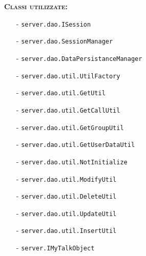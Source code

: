 \begin{description}
	\item{\scshape\bfseries Classi utilizzate:}
	\begin{itemize}[nolistsep, noitemsep]
	  \item[-] \texttt{server.dao.ISession}
	  \item[-] \texttt{server.dao.SessionManager}
	  \item[-] \texttt{server.dao.DataPersistanceManager}
	  \item[-] \texttt{server.dao.util.UtilFactory}
	  \item[-] \texttt{server.dao.util.GetUtil}
	  \item[-] \texttt{server.dao.util.GetCallUtil}
	  \item[-] \texttt{server.dao.util.GetGroupUtil}
	  \item[-] \texttt{server.dao.util.GetUserDataUtil}
	  \item[-] \texttt{server.dao.util.NotInitialize}
	  \item[-] \texttt{server.dao.util.ModifyUtil}
	  \item[-] \texttt{server.dao.util.DeleteUtil}
	  \item[-] \texttt{server.dao.util.UpdateUtil}
	  \item[-] \texttt{server.dao.util.InsertUtil}
	  \item[-] \texttt{server.IMyTalkObject}
	  
	\end{itemize}
\end{description}

